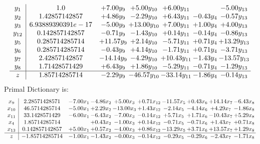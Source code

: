 \documentclass[9pt]{article}
\begin{document}
\[\begin{array}{c| c c@{\hskip 2pt} c@{\hskip 2pt} c@{\hskip 2pt} c@{\hskip 2pt} c@{\hskip 2pt} }
 y_{1}   &  1.0 & +  7.00 y_{9} & +  5.00 y_{10} & +  6.00 y_{11} &   & -5.00 y_{13}\\
 y_{2}   &  1.42857142857 & +  4.86 y_{9} & -2.29 y_{10} & +  6.43 y_{11} & -0.43 y_{4} & -0.57 y_{13}\\
 y_{3}   &  6.93889390391e-17 & -5.00 y_{9} & + 13.00 y_{10} & +  7.00 y_{11} & +  1.00 y_{4} & +  4.00 y_{13}\\
 y_{12}   &  0.142857142857 & -0.71 y_{9} & -1.43 y_{10} & +  0.14 y_{11} & -0.14 y_{4} & -0.86 y_{13}\\
 y_{5}   &  0.285714285714 & + 11.57 y_{9} & +  2.14 y_{10} & -5.71 y_{11} & +  0.71 y_{4} & + 13.29 y_{13}\\
 y_{6}   &  0.285714285714 & -0.43 y_{9} & +  4.14 y_{10} & -1.71 y_{11} & +  0.71 y_{4} & -3.71 y_{13}\\
 y_{7}   &  2.42857142857 & -14.14 y_{9} & -4.29 y_{10} & + 10.43 y_{11} & -1.43 y_{4} & -13.57 y_{13}\\
 y_{8}   &  1.71428571429 & +  6.43 y_{9} & +  1.86 y_{10} & -5.29 y_{11} & -0.71 y_{4} & -1.29 y_{13}\\
\hline
z    &  1.85714285714 & -2.29 y_{9} & -46.57 y_{10} & -33.14 y_{11} & -1.86 y_{4} & -0.14 y_{13}\\
\end{array}\]
Primal Dictionary is:
\[\begin{array}{c| c c@{\hskip 2pt} c@{\hskip 2pt} c@{\hskip 2pt} c@{\hskip 2pt} c@{\hskip 2pt} c@{\hskip 2pt} c@{\hskip 2pt} c@{\hskip 2pt} }
 x_{9}   &  2.28571428571 & -7.00 x_{1} & -4.86 x_{2} & +  5.00 x_{3} & +  0.71 x_{12} & -11.57 x_{5} & +  0.43 x_{6} & + 14.14 x_{7} & -6.43 x_{8}\\
 x_{10}   &  46.5714285714 & -5.00 x_{1} & +  2.29 x_{2} & -13.00 x_{3} & +  1.43 x_{12} & -2.14 x_{5} & -4.14 x_{6} & +  4.29 x_{7} & -1.86 x_{8}\\
 x_{11}   &  33.1428571429 & -6.00 x_{1} & -6.43 x_{2} & -7.00 x_{3} & -0.14 x_{12} & +  5.71 x_{5} & +  1.71 x_{6} & -10.43 x_{7} & +  5.29 x_{8}\\
 x_{4}   &  1.85714285714  &   & +  0.43 x_{2} & -1.00 x_{3} & +  0.14 x_{12} & -0.71 x_{5} & -0.71 x_{6} & +  1.43 x_{7} & +  0.71 x_{8}\\
 x_{13}   &  0.142857142857 & +  5.00 x_{1} & +  0.57 x_{2} & -4.00 x_{3} & +  0.86 x_{12} & -13.29 x_{5} & +  3.71 x_{6} & + 13.57 x_{7} & +  1.29 x_{8}\\
\hline
z    &  -1.85714285714 & -1.00 x_{1} & -1.43 x_{2} & -0.00 x_{3} & -0.14 x_{12} & -0.29 x_{5} & -0.29 x_{6} & -2.43 x_{7} & -1.71 x_{8}\\
\end{array}\]
\end{document}
